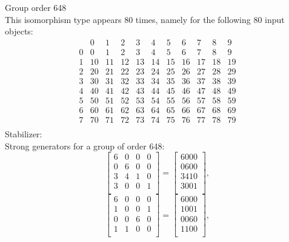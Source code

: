 \documentclass{article}
\begin{document}
{\bigskip

Group order 648\\
This isomorphism type appears 80 times, namely for the following 80 input objects: 
$$
\begin{array}{r|*{10}{r}}
 & 0 & 1 & 2 & 3 & 4 & 5 & 6 & 7 & 8 & 9\\
\hline
0 & 0 & 1 & 2 & 3 & 4 & 5 & 6 & 7 & 8 & 9\\
1 & 10 & 11 & 12 & 13 & 14 & 15 & 16 & 17 & 18 & 19\\
2 & 20 & 21 & 22 & 23 & 24 & 25 & 26 & 27 & 28 & 29\\
3 & 30 & 31 & 32 & 33 & 34 & 35 & 36 & 37 & 38 & 39\\
4 & 40 & 41 & 42 & 43 & 44 & 45 & 46 & 47 & 48 & 49\\
5 & 50 & 51 & 52 & 53 & 54 & 55 & 56 & 57 & 58 & 59\\
6 & 60 & 61 & 62 & 63 & 64 & 65 & 66 & 67 & 68 & 69\\
7 & 70 & 71 & 72 & 73 & 74 & 75 & 76 & 77 & 78 & 79\\
\end{array}
$$
Stabilizer:\\
Strong generators for a group of order 648:
$$
\left[
\begin{array}{*{4}{r}}
6 & 0 & 0 & 0\\
0 & 6 & 0 & 0\\
3 & 4 & 1 & 0\\
3 & 0 & 0 & 1\\
\end{array}
\right]
=
\left[
\begin{array}{c}
6000\\
0600\\
3410\\
3001\\
\end{array}
\right]
, 
$$
$$
\left[
\begin{array}{*{4}{r}}
6 & 0 & 0 & 0\\
1 & 0 & 0 & 1\\
0 & 0 & 6 & 0\\
1 & 1 & 0 & 0\\
\end{array}
\right]
=
\left[
\begin{array}{c}
6000\\
1001\\
0060\\
1100\\
\end{array}
\right]
, 
$$
}
\end{document}

